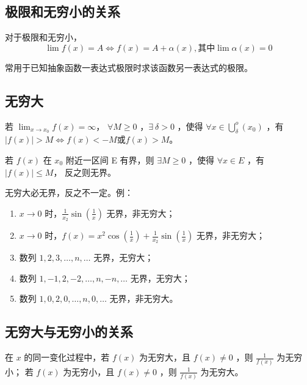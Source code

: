 \subsection{极限和无穷小的关系}

对于极限和无穷小，
$$
    \lim f(x)=A\Leftrightarrow f(x)=A+\alpha(x), \textrm{其中}\lim \alpha(x)=0
$$ 

常用于已知抽象函数一表达式极限时求该函数另一表达式的极限。

\subsection{无穷大}

\begin{Def}[无穷大的定义]

    若 $ \displaystyle\lim_{x\rightarrow x_0}f(x)=\infty $， $ \forall M\geq 0 $ ，$ \exists\ \delta>0 $ ，使得
    $ \forall x\in \displaystyle\bigcup^o_{\delta}(x_0) $ ，有 $ |f(x)|>M\Leftrightarrow f(x) < -M \textrm{或} f(x) > M $。    
\end{Def}

\begin{Def}[有界和无界的定义]

    若 $ f(x) $ 在 $ x_0 $ 附近一区间 E 有界，则 $ \exists M\geq0 $ ，使得 $ \forall x \in E $ ，有 $ |f(x)|\leq M $，
    反之则无界。
\end{Def}

无穷大必无界，反之不一定。例：
\begin{enumerate}
    \item $ x\rightarrow0 $ 时，$ \frac{1}{x_2}\sin(\frac{1}{x}) $ 无界，非无穷大；
    \item $ x\rightarrow0 $ 时，$ f(x)=x^2\cos(\frac{1}{x})+\frac{1}{x_2}\sin(\frac{1}{x}) $ 无界，非无穷大；
    \item 数列 $ 1,2,3,\dots,n,\dots $ 无界，无穷大；
    \item 数列 $ 1,-1,2,-2,\dots,n,-n,\dots $ 无界，无穷大；
    \item 数列 $ 1,0,2,0,\dots,n,0,\dots $ 无界，非无穷大。
\end{enumerate}

\subsection{无穷大与无穷小的关系}

在 $ x $ 的同一变化过程中，若 $ f(x) $ 为无穷大，且 $ f(x)\neq 0 $ ，则 $ \frac{1}{f(x)} $ 为无穷小；
若 $ f(x) $ 为无穷小，且 $ f(x)\neq 0 $ ，则 $ \frac{1}{f(x)} $ 为无穷大。

